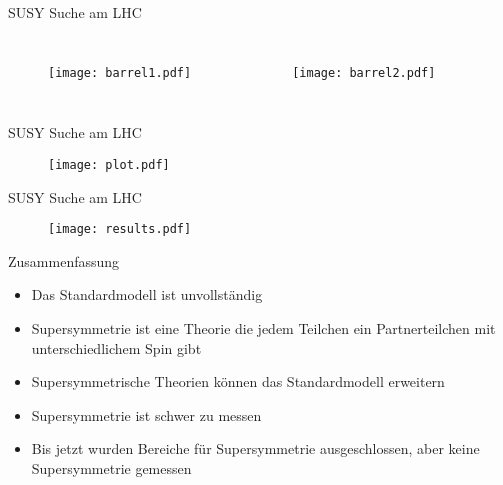 \documentclass[10pt]{beamer}
\begin{document}
\begin{frame}{SUSY Suche am LHC}

\begin{columns}[c,onlytextwidth]
    \begin{figure}[htp]
		\texttt{[image: barrel1.pdf]}
	\end{figure}
    \begin{figure}[htp]
		\texttt{[image: barrel2.pdf]}
	\end{figure}
\end{columns}
\end{frame}

\begin{frame}{SUSY Suche am LHC}

\begin{figure}[htp]
	\texttt{[image: plot.pdf]}
\end{figure}
\end{frame}

\begin{frame}{SUSY Suche am LHC}

\begin{figure}[htp]
	\texttt{[image: results.pdf]}
\end{figure}
\end{frame}

\begin{frame}{Zusammenfassung}
\begin{itemize}[<+- | alert@+>]
	\item Das Standardmodell ist unvollständig
	\item Supersymmetrie ist eine Theorie die jedem Teilchen ein Partnerteilchen mit unterschiedlichem Spin gibt
	\item Supersymmetrische Theorien können das Standardmodell erweitern
	\item Supersymmetrie ist schwer zu messen
	\item Bis jetzt wurden Bereiche für Supersymmetrie ausgeschlossen, aber keine Supersymmetrie gemessen
\end{itemize}
\end{frame}
\end{document}
